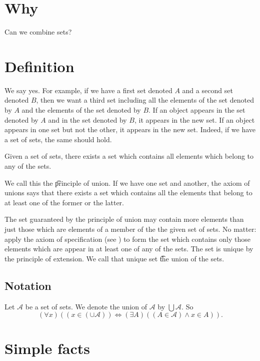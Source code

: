 
\section*{Why}

Can we combine sets?

\section*{Definition}

We say yes.
For example, if we have a first set denoted $A$ and a second set denoted $B$, then we want a third set including all the elements of the set denoted by $A$ and the elements of the set denoted by $B$.
If an object appears in the set denoted by $A$ and in the set denoted by $B$, it appears in the new set.
If an object appears in one set but not the other, it appears in the new set.
Indeed, if we have a set of sets, the same should hold.

\begin{principle}[Union]
Given a set of sets, there exists a set which contains all elements which belong to any of the sets.
\end{principle}

We call this the \t{principle of union}.
If we have one set and another, the axiom of unions says that there exists a set which contains all the elements that belong to at least one of the former or the latter.

The set guaranteed by the principle of union may contain more elements than just those which are elements of a member of the the given set of sets.
No matter: apply the axiom of specification (see ) to form the set which contains only those elements which are appear in at least one of any of the sets.
The set is unique by the principle of extension.
We call that unique set \t{the union} of the sets.

\subsection*{Notation}

Let $\mathcal{A} $ be a set of sets.
We denote the union of $\mathcal{A} $ by $\bigcup \mathcal{A} $.
So
\[
(\forall x)((x \in (\cup \mathcal{A} )) \iff (\exists  A)((A \in \mathcal{A} ) \land x \in A)).
\]

\section*{Simple facts}

